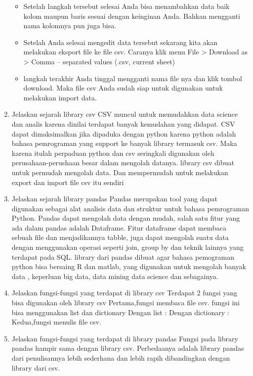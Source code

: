 \begin{enumerate}
\begin{itemize}
	\item Setelah langkah tersebut selesai Anda bisa menambahkan data baik kolom maupun baris sesuai dengan keinginan Anda. Bahkan mengganti nama kolomnya pun juga bisa.
	\item Setelah Anda selesai mengedit data tersebut sekarang kita akan melakukan eksport file ke file csv. Caranya klik menu File > Download as > Comma – separated values (.csv, current sheet)
	\item langkah terakhir Anda tinggal mengganti nama file nya dan klik tombol download. Maka file csv Anda sudah siap untuk digunakan untuk melakukan import data.
	\end{itemize}
    \item Jelaskan sejarah library csv
      CSV muncul untuk memudahkan data science dan analis karena dinilai terdapat banyak kemudahan yang didapat. CSV dapat dimaksimalkan jika dipaduka dengan python karena python adalah bahasa pemrograman yang support ke banyak library termasuk csv. Maka karena itulah 	perpaduan python dan csv seringkali digunakan oleh perusahaan-perushaan besar dalam mengolah datanya. library csv dibuat untuk permudah mengolah data. Dan mempermudah untuk melakukan export dan import file csv itu sendiri
    \item Jelaskan sejarah library pandas
    Pandas merupakan tool yang dapat digunakan sebagai alat analisis data dan struktur untuk bahasa pemrograman Python. Pandas dapat mengolah data dengan mudah, salah satu fitur yang ada dalam pandas adalah Dataframe. Fitur dataframe dapat membaca sebuah file dan menjadikannya tabble, juga dapat mengolah suatu data dengan menggunakan operasi seperti join, group by dan teknik lainnya yang terdapat pada SQL.  library dari pandas dibuat agar bahasa pemograman python bisa bersaing R dan matlab, yang digunakan untuk mengolah banyak data , keperluan big data, data mining data science dan sebagainya.
    \item Jelaskan fungsi-fungsi yang terdapat di library csv
    Terdapat 2 fungsi yang bisa digunakan oleh library csv
    Pertama,fungsi membaca file csv.
    fungsi ini bisa menggunakan list dan dictionary
    Dengan list :
    Dengan dictionary :
    Kedua,fungsi menulis file csv.
    \item Jelaskan fungsi-fungsi yang terdapat di library pandas
    Fungsi pada library pandas  hampir sama dengan library csv. Perbedaanya adalah library pandas dari penulisannya lebih sederhana dan lebih rapih dibandingkan dengan library dari csv.
\end{enumerate}


